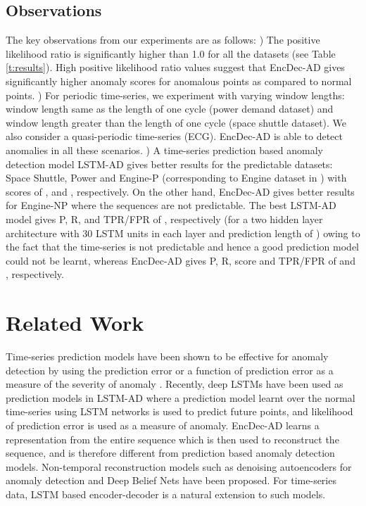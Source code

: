 \documentclass{article}
\begin{document}
\subsection{Observations}
The key observations from our experiments are as follows:
) The positive likelihood ratio is significantly higher than 1.0 for all the datasets (see Table \ref{t:results}). High positive likelihood ratio values suggest that EncDec-AD gives significantly higher anomaly scores for anomalous points as compared to normal points.
 ) For periodic time-series, we experiment with varying window lengths: window length same as the length of one cycle (power demand dataset) and window length greater than the length of one cycle (space shuttle dataset). We also consider a quasi-periodic time-series (ECG). EncDec-AD is able to detect anomalies in all these scenarios.
) A time-series prediction based anomaly detection model LSTM-AD \cite{p:lstm-ad} gives better results for the predictable datasets: Space Shuttle, Power and Engine-P (corresponding to Engine dataset in \cite{p:lstm-ad}) with  scores of ,  and , respectively. On the other hand, EncDec-AD gives better results for Engine-NP where the sequences are not predictable. The best LSTM-AD model gives P, R,  and TPR/FPR of , respectively (for a two hidden layer architecture with 30 LSTM units in each layer and prediction length of ) owing to the fact that the time-series is not predictable and hence a good prediction model could not be learnt, whereas EncDec-AD gives P, R,  score and TPR/FPR of  and , respectively. 

 
\section{Related Work}
Time-series prediction models have been shown to be effective for anomaly detection by using the prediction error or a function of prediction error as a measure of the severity of anomaly \cite{pred2_AD, ma2003online,p:markovAD}. Recently, deep LSTMs have been used as prediction models in LSTM-AD \cite{p:lstm-ad,p:lstm-ad-ecg,p:lstm-ad-ode} where a prediction model learnt over the normal time-series using LSTM networks is used to predict future points, and likelihood of prediction error is used as a measure of anomaly. EncDec-AD learns a representation from the entire sequence which is then used to reconstruct the sequence, and is therefore different from prediction based anomaly detection models. Non-temporal reconstruction models such as denoising autoencoders for anomaly detection \cite{p:autoencoderAD} and Deep Belief Nets \cite{p:dbn-eeg-AD} have been proposed. For time-series data, LSTM based encoder-decoder is a natural extension to such models. 
\end{document}
